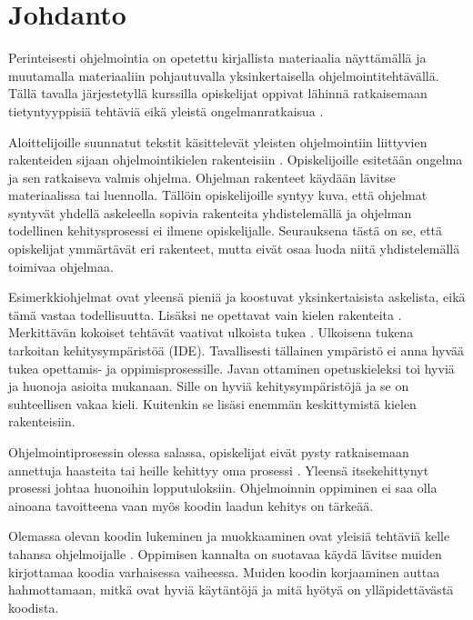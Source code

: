 \section{Johdanto}

Perinteisesti ohjelmointia on opetettu kirjallista materiaalia näyttämällä ja
muutamalla materiaaliin pohjautuvalla yksinkertaisella ohjelmointitehtävällä.
Tällä tavalla järjestetyllä kurssilla opiskelijat oppivat lähinnä ratkaisemaan
tietyntyyppisiä tehtäviä eikä yleistä ongelmanratkaisua
\cite{Gries:1974:WTI:953057.810447}.

Aloittelijoille suunnatut tekstit käsittelevät yleisten ohjelmointiin liittyvien
rakenteiden sijaan ohjelmointikielen rakenteisiin
\cite{Caspersen:2006:NPO:1176617.1176741, Vihavainen:2011:EAM:1953163.1953196}.
Opiskelijoille esitetään ongelma ja sen ratkaiseva valmis ohjelma. Ohjelman
rakenteet käydään lävitse materiaalissa tai luennolla. Tällöin opiskelijoille
syntyy kuva, että ohjelmat syntyvät yhdellä askeleella sopivia rakenteita
yhdistelemällä ja ohjelman todellinen kehitysprosessi ei ilmene opiskelijalle.
Seurauksena tästä on se, että opiskelijat ymmärtävät eri rakenteet, mutta eivät
osaa luoda niitä yhdistelemällä toimivaa ohjelmaa.

Esimerkkiohjelmat ovat yleensä pieniä ja koostuvat yksinkertaisista askelista,
eikä tämä vastaa todellisuutta. Lisäksi ne opettavat vain kielen rakenteita
\cite{Astrachan:1995:ACA:199691.199694}. Merkittävän kokoiset tehtävät vaativat
ulkoista tukea \cite{Kolling:2008}. Ulkoisena tukena tarkoitan kehitysympäristöä
(IDE). Tavallisesti tällainen ympäristö ei anna hyvää tukea opettamis- ja
oppimisprosessille. Javan ottaminen opetuskieleksi toi hyviä ja huonoja asioita
mukanaan. Sille on hyviä kehitysympäristöjä ja se on suhteellisen vakaa kieli.
Kuitenkin se lisäsi enemmän keskittymistä kielen rakenteisiin.

Ohjelmointiprosessin olessa salassa, opiskelijat eivät pysty ratkaisemaan
annettuja haasteita tai heille kehittyy oma prosessi
\cite{Caspersen:2006:NPO:1176617.1176741}. Yleensä itsekehittynyt prosessi
johtaa huonoihin lopputuloksiin. Ohjelmoinnin oppiminen ei saa olla ainoana
tavoitteena vaan myös koodin laadun kehitys on tärkeää.

Olemassa olevan koodin lukeminen ja muokkaaminen ovat yleisiä tehtäviä kelle
tahansa ohjelmoijalle \cite{Kolling:2008}. Oppimisen kannalta on suotavaa käydä
lävitse muiden kirjottamaa koodia varhaisessa vaiheessa. Muiden koodin
korjaaminen auttaa hahmottamaan, mitkä ovat hyviä käytäntöjä ja mitä hyötyä on
ylläpidettävästä koodista.
